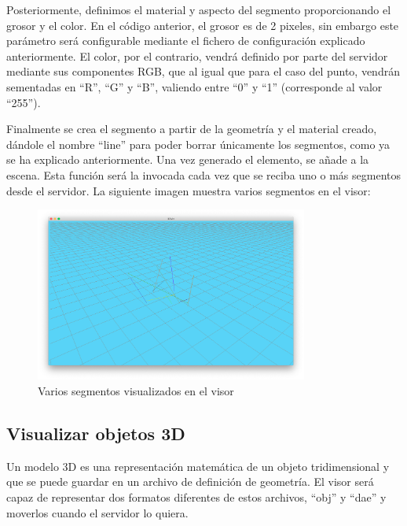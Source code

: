 Posteriormente, definimos el material y aspecto del segmento proporcionando el grosor y el color. En el código anterior, el grosor es de 2 pixeles, sin embargo este parámetro será configurable mediante el fichero de configuración explicado anteriormente. El color, por el contrario, vendrá definido por parte del servidor mediante sus componentes RGB, que al igual que para el caso del punto, vendrán sementadas en ``R'', ``G'' y ``B'', valiendo entre ``0''  y ``1'' (corresponde al valor ``255'').

Finalmente se crea el segmento a partir de la geometría y el material creado, dándole el nombre ``line'' para poder borrar únicamente los segmentos, como ya se ha explicado anteriormente. Una vez generado el elemento, se añade a la escena. Esta función será la invocada cada vez que se reciba uno o más segmentos desde el servidor. La siguiente imagen muestra varios segmentos en el visor:
\begin{figure}[H]
  \begin{center}
    \includegraphics[width=0.8\textwidth]{figures/visualizarlineas.png}
		\caption{Varios segmentos visualizados en el visor}
		\label{fig.visualizarsegmentos}
		\end{center}
\end{figure}

\subsection{Visualizar objetos 3D}
Un modelo 3D es una representación matemática de un objeto tridimensional y que se puede guardar en un archivo de definición de geometría. El visor será capaz de representar dos formatos diferentes de estos archivos, ``obj'' y ``dae'' y moverlos cuando el servidor lo quiera. 

